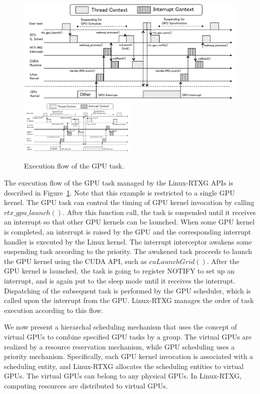 \begin{figure}[!t]
\begin{center}
 \ifthesis
 \includegraphics[width=\textwidth]{img/gsched_controlflow.pdf}
 \else
 \includegraphics[width=0.5\textwidth]{img/gsched_controlflow.pdf}
 \fi
 \caption{Execution flow of the GPU task.}
 \label{fig:controlflow}
\end{center}
\end{figure}

The execution flow of the GPU task managed by the Linux-RTXG APIs is
described in Figure~\ref{fig:controlflow}.
Note that this example is restricted to a single GPU kernel.
The GPU task can control the timing of GPU kernel invocation by calling
$rtx\_gpu\_launch()$.
After this function call, the task is suspended until it receives an
interrupt so that other GPU kernels can be launched.
When some GPU kernel is completed, an interrupt is raised by the GPU and
the corresponding interrupt handler is executed by the Linux kernel.
The interrupt interceptor awakens some suspending task according to the
priority.
The awakened task proceeds to launch the GPU kernel using the CUDA API,
such as $cuLaunchGrid()$.
After the GPU kernel is launched, the task is going to register NOTIFY
to set up an interrupt, and is again put to the sleep mode until it
receives the interrupt.
Dispatching of the subsequent task is performed by the GPU scheduler,
which is called upon the interrupt from the GPU.
Linux-RTXG manages the order of task execution according to this flow.

We now present a hierarchal scheduling mechanism that uses the concept
of virtual GPUs to combine specified GPU tasks by a group.
The virtual GPUs are realized by a resource reservation mechanism, while
GPU scheduling uses a priority mechanism.
Specifically, each GPU kernel invocation is associated with a scheduling
entity, and Linux-RTXG allocates the scheduling entities to virtual GPUs. 
The virtual GPUs can belong to any physical GPUs.
In Linux-RTXG, computing resources are distributed to virtual GPUs.


